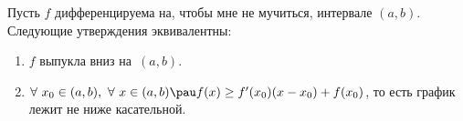 
    Пусть $f$ дифференцируема на, чтобы мне не мучиться, интервале $(a,b)$. Следующие утверждения эквивалентны:

    \begin{enumerate}
        \item $f$ выпукла вниз на~$(a,b)$.

        \item $\forall\  x_0\in(a,b),\ \forall\  x\in(a,b)\pau f(x)\geq f'(x_0)(x-x_0)+f(x_0)$, то есть график лежит не ниже касательной.
    \end{enumerate}

